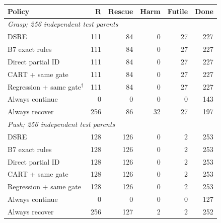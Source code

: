 \begin{tabular}{@{}lrrrrr@{}}
\toprule
Policy & R & Rescue & Harm & Futile & Done\\
\midrule
\multicolumn{6}{l}{\textit{Grasp; 256 independent test parents}}\\
DSRE & 111 & 84 & 0 & 27 & 227\\
B7 exact rules & 111 & 84 & 0 & 27 & 227\\
Direct partial ID & 111 & 84 & 0 & 27 & 227\\
CART + same gate & 111 & 84 & 0 & 27 & 227\\
Regression + same gate$^\dagger$ & 111 & 84 & 0 & 27 & 227\\
Always continue & 0 & 0 & 0 & 0 & 143\\
Always recover & 256 & 86 & 32 & 27 & 197\\
\midrule
\multicolumn{6}{l}{\textit{Push; 256 independent test parents}}\\
DSRE & 128 & 126 & 0 & 2 & 253\\
B7 exact rules & 128 & 126 & 0 & 2 & 253\\
Direct partial ID & 128 & 126 & 0 & 2 & 253\\
CART + same gate & 128 & 126 & 0 & 2 & 253\\
Regression + same gate & 128 & 126 & 0 & 2 & 253\\
Always continue & 0 & 0 & 0 & 0 & 127\\
Always recover & 256 & 127 & 2 & 2 & 252\\
\bottomrule
\end{tabular}
